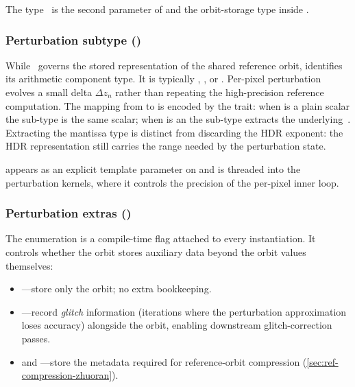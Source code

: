 \noindent
The type~ is the second parameter of 
and the orbit-storage type inside .


\subsubsection{Perturbation subtype ()}
\label{subsec:template-subtype}

While~ governs the stored representation of the shared reference orbit,
 identifies its arithmetic component type. It is typically
, , or .
Per-pixel perturbation evolves a small delta $\Delta z_n$ rather than repeating
the high-precision reference computation. The mapping from  to
 is encoded by the  trait: when
 is a plain scalar the sub-type is the same scalar; when
 is an  the sub-type extracts the
underlying~. Extracting the mantissa type is distinct from discarding
the HDR exponent: the HDR representation still carries the range needed by
the perturbation state.

 appears as an explicit template parameter on
 and is threaded into the perturbation kernels, where it
controls the precision of the per-pixel inner loop.


\subsubsection{Perturbation extras ()}
\label{subsec:template-pextras}

The  enumeration is a compile-time flag attached to
every  instantiation.  It controls whether
the orbit stores auxiliary data beyond the orbit values themselves:

\begin{itemize}
  \item {}---store only the orbit; no extra bookkeeping.
  \item {}---record \emph{glitch} information (iterations where
        the perturbation approximation loses accuracy) alongside the
        orbit, enabling downstream glitch-correction passes.
  \item {} and ---store the
        metadata required for reference-orbit compression
        (\cref{sec:ref-compression-zhuoran}).
\end{itemize}

